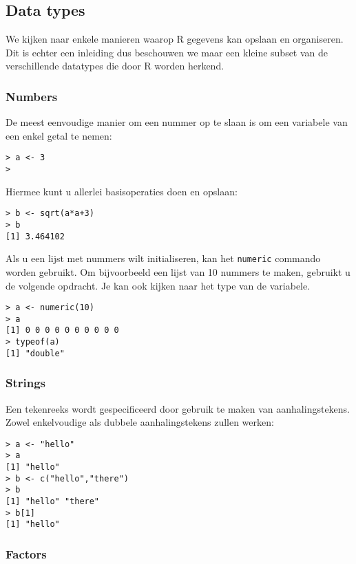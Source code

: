 \subsection{Data types}

We kijken naar enkele manieren waarop R gegevens kan opslaan en organiseren. Dit is echter een inleiding dus beschouwen we maar een kleine subset van de verschillende datatypes die door R worden herkend. 

\subsubsection{Numbers}

De meest eenvoudige manier om een nummer op te slaan is om een variabele van een enkel getal te nemen:

\begin{lstlisting}
> a <- 3
>
\end{lstlisting}

Hiermee kunt u allerlei basisoperaties doen en opslaan:

\begin{lstlisting}
> b <- sqrt(a*a+3)
> b
[1] 3.464102
\end{lstlisting}

Als u een lijst met nummers wilt initialiseren, kan het \texttt{numeric} commando worden gebruikt. Om bijvoorbeeld een lijst van 10 nummers te maken, gebruikt u de volgende opdracht. Je kan ook kijken naar het type van de variabele.

\begin{lstlisting}
> a <- numeric(10)
> a
[1] 0 0 0 0 0 0 0 0 0 0
> typeof(a)
[1] "double"
\end{lstlisting}

\subsubsection{Strings}

Een tekenreeks wordt gespecificeerd door gebruik te maken van aanhalingstekens. Zowel enkelvoudige als dubbele aanhalingstekens zullen werken:

\begin{lstlisting}
> a <- "hello"
> a
[1] "hello"
> b <- c("hello","there")
> b
[1] "hello" "there"
> b[1]
[1] "hello"
\end{lstlisting}

\subsubsection{Factors}

